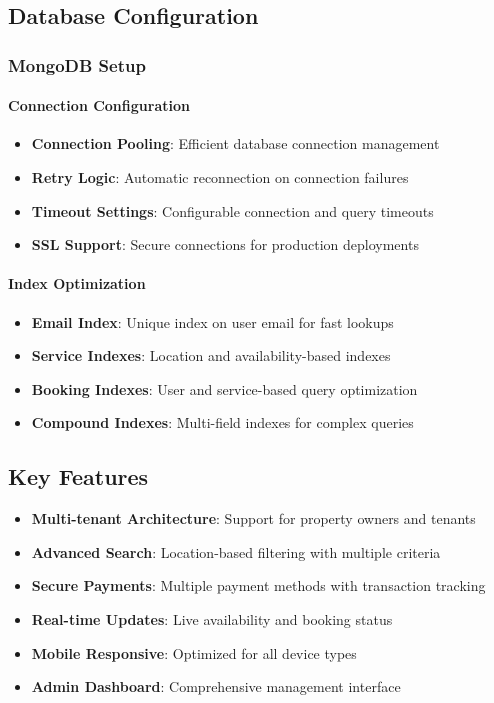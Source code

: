 \documentclass[12pt,a4paper]{article}
\begin{document}
\subsection{Database Configuration}
\label{subsec:database-config}

\subsubsection{MongoDB Setup}
\label{subsubsec:mongodb-setup}

\paragraph{Connection Configuration}
\begin{itemize}
\item \textbf{Connection Pooling}: Efficient database connection management
\item \textbf{Retry Logic}: Automatic reconnection on connection failures
\item \textbf{Timeout Settings}: Configurable connection and query timeouts
\item \textbf{SSL Support}: Secure connections for production deployments
\end{itemize}

\paragraph{Index Optimization}
\begin{itemize}
\item \textbf{Email Index}: Unique index on user email for fast lookups
\item \textbf{Service Indexes}: Location and availability-based indexes
\item \textbf{Booking Indexes}: User and service-based query optimization
\item \textbf{Compound Indexes}: Multi-field indexes for complex queries
\end{itemize}

\subsection{Key Features}

\begin{itemize}
\item \textbf{Multi-tenant Architecture}: Support for property owners and tenants
\item \textbf{Advanced Search}: Location-based filtering with multiple criteria
\item \textbf{Secure Payments}: Multiple payment methods with transaction tracking
\item \textbf{Real-time Updates}: Live availability and booking status
\item \textbf{Mobile Responsive}: Optimized for all device types
\item \textbf{Admin Dashboard}: Comprehensive management interface
\end{itemize}
\end{document}
